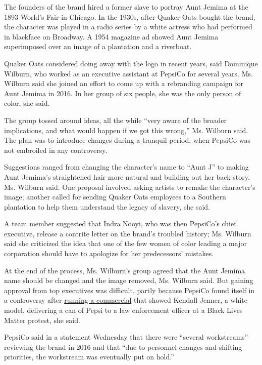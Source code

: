 The founders of the brand hired a former slave to portray Aunt Jemima at
the 1893 World's Fair in Chicago. In the 1930s, after Quaker Oats bought
the brand, the character was played in a radio series by a white actress
who had performed in blackface on Broadway. A 1954 magazine ad showed
Aunt Jemima superimposed over an image of a plantation and a riverboat.

Quaker Oats considered doing away with the logo in recent years, said
Dominique Wilburn, who worked as an executive assistant at PepsiCo for
several years. Ms. Wilburn said she joined an effort to come up with a
rebranding campaign for Aunt Jemima in 2016. In her group of six people,
she was the only person of color, she said.

The group tossed around ideas, all the while ``very aware of the broader
implications, and what would happen if we got this wrong,'' Ms. Wilburn
said. The plan was to introduce changes during a tranquil period, when
PepsiCo was not embroiled in any controversy.

Suggestions ranged from changing the character's name to ``Aunt J'' to
making Aunt Jemima's straightened hair more natural and building out her
back story, Ms. Wilburn said. One proposal involved asking artists to
remake the character's image; another called for sending Quaker Oats
employees to a Southern plantation to help them understand the legacy of
slavery, she said.

A team member suggested that Indra Nooyi, who was then PepsiCo's chief
executive, release a contrite letter on the brand's troubled history;
Ms. Wilburn said she criticized the idea that one of the few women of
color leading a major corporation should have to apologize for her
predecessors' mistakes.

At the end of the process, Ms. Wilburn's group agreed that the Aunt
Jemima name should be changed and the image removed, Ms. Wilburn said.
But gaining approval from top executives was difficult, partly because
PepsiCo found itself in a controversy after
\href{https://www.nytimes3xbfgragh.onion/2017/04/05/business/kendall-jenner-pepsi-ad.html}{running
a commercial} that showed Kendall Jenner, a white model, delivering a
can of Pepsi to a law enforcement officer at a Black Lives Matter
protest, she said.

PepsiCo said in a statement Wednesday that there were ``several
workstreams'' reviewing the brand in 2016 and that ``due to personnel
changes and shifting priorities, the workstream was eventually put on
hold.''

